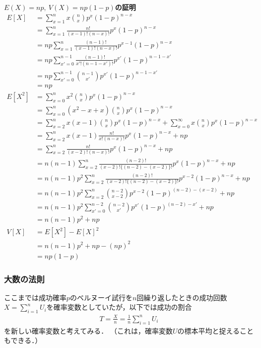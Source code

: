 \clearpage
\noindent\textbf{$ E(X)=np,\ V(X)=np(1-p) $の証明}\\
\noindent\hrulefill
%
\begin{align*}
	E[X] 
	&= \sum_{x=1}^{n} x\binom{n}{x} p^{x}(1-p)^{n-x} \\
	&= \sum_{x=1}^{n} \frac{n!}{(x-1)!(n-x)!} p^{x}(1-p)^{n-x} \\
	&= np\sum_{x=1}^{n} \frac{(n-1)!}{(x-1)!(n-x)!} p^{x-1}(1-p)^{n-x} \\
	&= np\sum_{x'=0}^{n-1} \frac{(n-1)!}{x'!(n-1-x')!} p^{x'}(1-p)^{n-1-x'} \\
	&= np\sum_{x'=0}^{n-1} \binom{n-1}{x'} p^{x'}(1-p)^{n-1-x'} \\
	&= np \\
	E[X^{2}]
	&= \sum_{x=0}^{n} x^{2}\binom{n}{x} p^{x}(1-p)^{n-x} \\
	&= \sum_{x=0}^{n} (x^{2}-x+x)\binom{n}{x} p^{x}(1-p)^{n-x} \\
	&= \sum_{x=2}^{n} x(x-1)\binom{n}{x} p^{x}(1-p)^{n-x} + \sum_{x=0}^{\infty} x\binom{n}{x} p^{x}(1-p)^{n-x} \\
	&= \sum_{x=2}^{n} x(x-1) \frac{n!}{x!(n-x)!} p^{x}(1-p)^{n-x} + np \\
	&= \sum_{x=2}^{n} \frac{n!}{(x-2)!(n-x)!} p^{x}(1-p)^{n-x} + np \\
	&= n(n-1)\sum_{x=2}^{n} \frac{(n-2)!}{(x-2)!\{(n-2)-(x-2)\}!} p^{x}(1-p)^{n-x} + np \\
	&= n(n-1)p^{2}\sum_{x=2}^{n} \frac{(n-2)!}{(x-2)!\{(n-2)-(x-2)\}!} p^{x-2}(1-p)^{n-x} + np \\
	&= n(n-1)p^{2}\sum_{x=2}^{n} \binom{n-2}{x-2} p^{x-2}(1-p)^{(n-2)-(x-2)} + np \\
	&= n(n-1)p^{2}\sum_{x'=0}^{n-2} \binom{n-2}{x'} p^{x'}(1-p)^{(n-2)-x'} + np \\
	&= n(n-1)p^{2} + np 
	\\
	V[X] 
	&= E[X^{2}] - E[X]^{2} \\
	&= n(n-1)p^{2} + np - (np)^{2} \\
	&= np(1-p)
\end{align*}
%




\subsubsection*{大数の法則}
%
ここまでは成功確率$ p $のベルヌーイ試行を$ n $回繰り返したときの成功回数$ X=\displaystyle\sum_{i=1}^{n} U_{i} $を確率変数としていたが，以下では成功の割合
%
\begin{align*}
	T = \frac{X}{n} = \frac{1}{n}\displaystyle\sum_{i=1}^{n} U_{i}
\end{align*}
%
を新しい確率変数と考えてみる．
%
（これは，確率変数$ U $の標本平均と捉えることもできる．）
%

